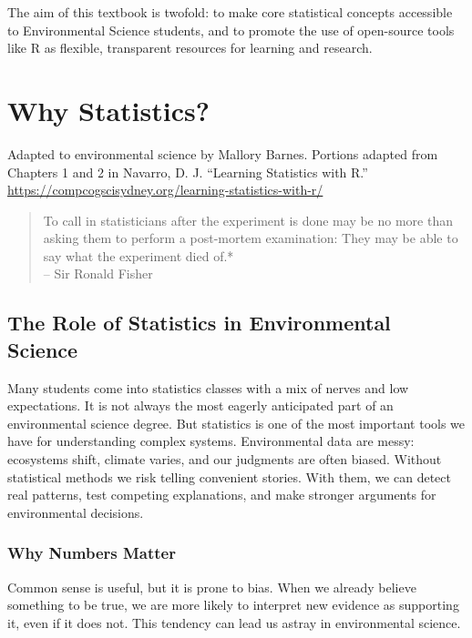 \documentclass[
  letterpaper,
  DIV=11,
  numbers=noendperiod]{scrreprt}
\begin{document}
The aim of this textbook is twofold: to make core statistical concepts
accessible to Environmental Science students, and to promote the use of
open-source tools like R as flexible, transparent resources for learning
and research.


\chapter{Why Statistics?}\label{why-statistics}

Adapted to environmental science by Mallory Barnes. Portions adapted
from Chapters 1 and 2 in Navarro, D. J. ``Learning Statistics with R.''
\url{https://compcogscisydney.org/learning-statistics-with-r/}

\hfill\break

\begin{quote}
To call in statisticians after the experiment is done may be no more
than asking them to perform a post-mortem examination: They may be able
to say what the experiment died of.*\\
-- Sir Ronald Fisher
\end{quote}

\section{The Role of Statistics in Environmental
Science}\label{the-role-of-statistics-in-environmental-science}

Many students come into statistics classes with a mix of nerves and low
expectations. It is not always the most eagerly anticipated part of an
environmental science degree. But statistics is one of the most
important tools we have for understanding complex systems. Environmental
data are messy: ecosystems shift, climate varies, and our judgments are
often biased. Without statistical methods we risk telling convenient
stories. With them, we can detect real patterns, test competing
explanations, and make stronger arguments for environmental decisions.

\subsection{Why Numbers Matter}\label{why-numbers-matter}

Common sense is useful, but it is prone to bias. When we already believe
something to be true, we are more likely to interpret new evidence as
supporting it, even if it does not. This tendency can lead us astray in
environmental science.
\end{document}
